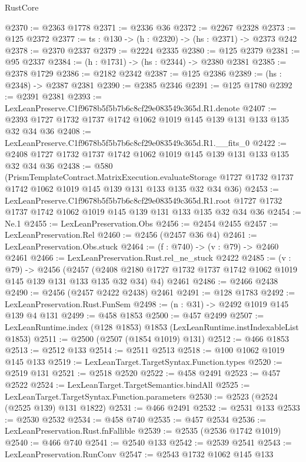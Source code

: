 \begin{lexlean}{RustCore}
\begin{coremodule}
@2370 := @2363 @1778
@2371 := @2336 @36
@2372 := @2267 @2328
@2373 := @125 @2372
@2377 := {ts : @130} -> (h : @2320) -> (hs : @2371) -> @2373 @242
@2378 := @2370 @2337
@2379 := @2224 @2335
@2380 := @125 @2379
@2381 := @95 @2337
@2384 := (h : @1731) -> (hs : @2344) -> @2380 @2381
@2385 := @2378 @1729
@2386 := @2182 @2342
@2387 := @125 @2386
@2389 := (hs : @2348) -> @2387 @2381
@2390 := @2385 @2346
@2391 := @125 @1780
@2392 := @2391 @2381
@2393 := LexLeanPreserve.C1f9678b5f5b7b6c8cf29e083549c365d.R1.denote
@2407 := @2393 @1727 @1732 @1737 @1742 @1062 @1019 @145 @139 @131 @133 @135 @32 @34 @36
@2408 := LexLeanPreserve.C1f9678b5f5b7b6c8cf29e083549c365d.R1.__fits_0
@2422 := @2408 @1727 @1732 @1737 @1742 @1062 @1019 @145 @139 @131 @133 @135 @32 @34 @36
@2438 := @580
    (PrismTemplateContract.MatrixExecution.evaluateStorage
      @1727
      @1732
      @1737
      @1742
      @1062
      @1019
      @145
      @139
      @131
      @133
      @135
      @32
      @34
      @36)
@2453 := LexLeanPreserve.C1f9678b5f5b7b6c8cf29e083549c365d.R1.root
    @1727
    @1732
    @1737
    @1742
    @1062
    @1019
    @145
    @139
    @131
    @133
    @135
    @32
    @34
    @36
@2454 := Ne.{1}
@2455 := LexLeanPreservation.Obs
@2456 := @2454 @2455
@2457 := LexLeanPreservation.Rel
@2460 := @2456 (@2457 @36 @4)
@2461 := LexLeanPreservation.Obs.stuck
@2464 := (f : @740) -> (v : @79) -> @2460 @2461
@2466 := LexLeanPreservation.Rust.rel_ne_stuck @2422
@2485 := (v : @79) ->
  @2456
    (@2457 (@2408 @2180 @1727 @1732 @1737 @1742 @1062 @1019 @145 @139 @131 @133 @135 @32 @34) @4)
    @2461
@2486 := @2466 @2438
@2490 := @2456 (@2457 @2422 @2438) @2461
@2491 := @128 @1783
@2492 := LexLeanPreservation.Rust.FunSem
@2498 := (n : @31) -> @2492 @1019 @145 @139 @4 @131
@2499 := @458 @1853
@2500 := @457 @2499
@2507 := LexLeanRuntime.index (@128 @1853) @1853 (LexLeanRuntime.instIndexableList @1853)
@2511 := @2500 (@2507 (@1854 @1019) @131)
@2512 := @466 @1853
@2513 := @2512 @133
@2514 := @2511 @2513
@2518 := @100 @1062 @1019 @145 @133
@2519 := LexLeanTarget.TargetSyntax.Function.types
@2520 := @2519 @131
@2521 := @2518 @2520
@2522 := @458 @2491
@2523 := @457 @2522
@2524 := LexLeanTarget.TargetSemantics.bindAll
@2525 := LexLeanTarget.TargetSyntax.Function.parameters
@2530 := @2523 (@2524 (@2525 @139) @131 @1822)
@2531 := @466 @2491
@2532 := @2531 @133
@2533 := @2530 @2532
@2534 := @458 @740
@2535 := @457 @2534
@2536 := LexLeanPreservation.Rust.fnFallible
@2539 := @2535 (@2536 @1742 @1019)
@2540 := @466 @740
@2541 := @2540 @133
@2542 := @2539 @2541
@2543 := LexLeanPreservation.RunConv
@2547 := @2543 @1732 @1062 @145 @133

\end{coremodule}
\end{lexlean}
